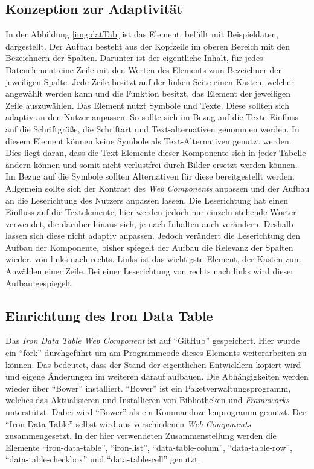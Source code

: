 \documentclass[12pt, paper=a4, bibtotoc, toc=listof, headsepline=true]{scrreprt}
\begin{document}
	\subsection{Konzeption zur Adaptivität}
	\label{sec:konZurAda}
	In der Abbildung \ref{img:datTab} ist das Element, befüllt mit Beispieldaten, dargestellt. Der Aufbau besteht aus der Kopfzeile im oberen Bereich mit den Bezeichnern der Spalten. Darunter ist der eigentliche Inhalt, für jedes Datenelement eine Zeile mit den Werten des Elements zum Bezeichner der jeweiligen Spalte. Jede Zeile besitzt auf der linken Seite einen Kasten, welcher angewählt werden kann und die Funktion besitzt, das Element der jeweiligen Zeile auszuwählen.
	\newline
	Das Element nutzt Symbole und Texte. Diese sollten sich adaptiv an den Nutzer anpassen. So sollte sich im Bezug auf die Texte Einfluss auf die Schriftgröße, die Schriftart und Text-alternativen genommen werden. In diesem Element können keine Symbole als Text-Alternativen genutzt werden. Dies liegt daran, dass die Text-Elemente dieser Komponente sich in jeder Tabelle ändern können und somit nicht verlustfrei durch Bilder ersetzt werden können. Im Bezug auf die Symbole sollten Alternativen für diese bereitgestellt werden. Allgemein sollte sich der Kontrast des \emph{Web Components} anpassen und der Aufbau an die Leserichtung des Nutzers anpassen lassen. Die Leserichtung hat einen Einfluss auf die Textelemente, hier werden jedoch nur einzeln stehende Wörter verwendet, die darüber hinaus sich, je nach Inhalten auch verändern. Deshalb lassen sich diese nicht adaptiv anpassen. Jedoch verändert die Leserichtung den Aufbau der Komponente, bisher spiegelt der Aufbau die Relevanz der Spalten wieder, von links nach rechts. Links ist das wichtigste Element, der Kasten zum Anwählen einer Zeile. Bei einer Leserichtung von rechts nach links wird dieser Aufbau gespiegelt.  
	\subsection{Einrichtung des Iron Data Table}
	Das \emph{Iron Data Table Web Component} ist auf \enquote{GitHub} gespeichert. Hier wurde ein \enquote{fork} durchgeführt um am Programmcode dieses Elements weiterarbeiten zu können. Das bedeutet, dass der Stand der eigentlichen Entwicklern kopiert wird und eigene Änderungen im weiteren darauf aufbauen. Die Abhängigkeiten werden wieder über \enquote{Bower} installiert. \enquote{Bower} ist ein Paketverwaltungsprogramm, welches das Aktualisieren und Installieren von Bibliotheken und \emph{Frameworks} unterstützt. Dabei wird \enquote{Bower} als ein Kommandozeilenprogramm genutzt\cite{bower}. Der \enquote{Iron Data Table} selbst wird aus verschiedenen \emph{Web Components} zusammengesetzt. In der hier verwendeten Zusammenstellung werden die Elemente \enquote{iron-data-table}, \enquote{iron-list}, \enquote{data-table-colum}, \enquote{data-table-row}, \enquote{data-table-checkbox} und \enquote{data-table-cell}  genutzt.  
\end{document}
